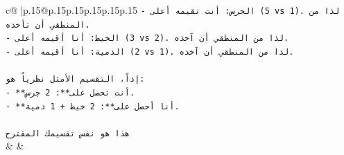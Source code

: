 \documentclass{article}
\begin{document}
{\begin{supertabular}{c@{$\;$}|p{.15\linewidth}@{}p{.15\linewidth}p{.15\linewidth}p{.15\linewidth}p{.15\linewidth}p{.15\linewidth}}
{{{\texttt{{-} الجرس: أنت تقيمه أعلى (5 vs 1). لذا من المنطقي أن تأخذه.} \\
\texttt{{-} الخيط: أنا أقيمه أعلى (3 vs 2). لذا من المنطقي أن آخذه.} \\
\texttt{{-} الدمية: أنا أقيمه أعلى (2 vs 1). لذا من المنطقي أن آخذه.} \\
\\ 
\texttt{إذاً، التقسيم الأمثل نظرياً هو:} \\
\texttt{{-} **أنت تحصل على**: 2 جرس.} \\
\texttt{{-} **أنا أحصل على**: 2 خيط + 1 دمية.} \\
\\ 
\texttt{هذا هو نفس تقسيمك المقترح} \\
            }
        }
    }
    & & \\ \\


\end{supertabular}}
\end{document}
